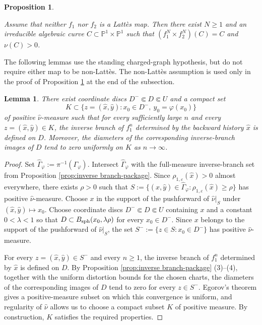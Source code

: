 \documentclass[11pt]{amsart}
\numberwithin{equation}{section}
\theoremstyle{plain}
\newtheorem{prop}[thm]{Proposition}
\newtheorem{lem}[thm]{Lemma}
\theoremstyle{definition}
\theoremstyle{remark}
\begin{document}
\begin{prop}\label{prop:finite-case-algebraization}

Assume that neither $f_1$ nor $f_2$ is a Latt\`es map. Then there
exist $N\geq1$ and an irreducible algebraic curve
$C\subset\mathbb P^1\times\mathbb P^1$ such that
$(f_1^N\times f_2^N)(C)=C$ and $\nu(C)>0$.
\end{prop}

The following lemmas use the standing charged-graph hypothesis, but
do not require either map to be non-Lattès. The non-Lattès assumption
is used only in the proof of Proposition
\ref{prop:finite-case-algebraization} at the end of the subsection.

\begin{lem}\label{lem:uniform-charged-inverse-box}
There exist coordinate discs
$
D^-\Subset D\Subset U
$
and a compact set
$$
K\subset
\{z=(\hat x,\hat y):x_0\in D^-,
\ y_0=\varphi(x_0)\}
$$
of positive $\hat\nu$-measure 
such that for every sufficiently large $n$ and every
$z=(\hat x,\hat y)\in K$, the inverse branch of $f_1^n$
determined by the backward history $\hat x$ is defined on $D$.
Moreover, the diameters of the corresponding inverse-branch images
of $D$ tend to zero uniformly on $K$ as $n\to\infty$.
\end{lem}

\begin{proof}
Set $\hat\Gamma_\varphi:=\pi^{-1}(\Gamma_\varphi)$.
Intersect $\hat\Gamma_\varphi$ with the full-measure
inverse-branch set from Proposition
\ref{prop:inverse branch-package}. Since
$\rho_{1,\varepsilon}(\hat x)>0$ almost everywhere, there exists
$\rho>0$ such that
$S:=
\{(\hat x,\hat y)\in\hat\Gamma_\varphi:
\rho_{1,\varepsilon}(\hat x)\geq\rho\}$
has positive $\hat\nu$-measure.
Choose $x$ in the support of the pushforward of
$\hat\nu|_S$ under $(\hat x,\hat y)\mapsto x_0$.
Choose coordinate discs $D^-\Subset D\Subset U$ containing $x$
and a constant $0<\lambda<1$ so that
$D\subset B_{\rm sph}(x_0,\lambda\rho)$ for every $x_0\in D^-$.
Since $x$ belongs to the support of the pushforward of
$\hat\nu|_S$, the set
$S^-:=\{z\in S:x_0\in D^-\}$ has positive
$\hat\nu$-measure.

For every $z=(\hat x,\hat y)\in S^-$ and every $n\geq1$, the
inverse branch of $f_1^n$ determined by $\hat x$ is defined on $D$.
By Proposition \ref{prop:inverse branch-package} (3)--(4), together
with the uniform distortion bounds for the chosen charts, the
diameters of the corresponding images of $D$ tend to zero for every
$z\in S^-$. Egorov's theorem gives a positive-measure subset on
which this convergence is uniform, and regularity of $\hat\nu$
allows us to choose a compact subset $K$ of positive measure.
By construction,
$K$ satisfies
the required properties.
\end{proof}
\end{document}

